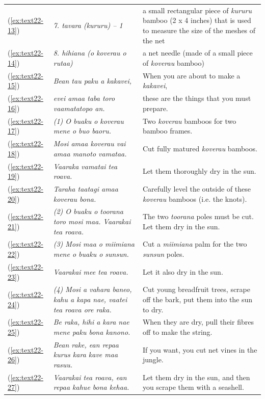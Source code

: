 \documentclass[output=paper]{langscibook}
\begin{document}
\begin{xltabular}{\textwidth}{lXX}
	(\ref{ex:text22-13})&\textit{7. tavara (kururu) -- 1}&a small rectangular piece of \textit{kururu} bamboo (2 x 4 inches) that is used to measure the size of the meshes of the net\\
    (\ref{ex:text22-14})&\textit{8. hihiana (o koverau o rutaa)}&a net needle (made of a small piece of \textit{koverau} bamboo)\\
	(\ref{ex:text22-15})&\textit{Bean tau paku a kakavei,}&When you are about to make a \textit{kakavei},\\
	(\ref{ex:text22-16})&\textit{evei amaa taba toro vaamatatopo an.}&these are the things that you must prepare.\\
	(\ref{ex:text22-17})&\textit{(1) O buaku o koverau mene o buo baoru.}&Two \textit{koverau} bamboos for two bamboo frames.\\
	(\ref{ex:text22-18})&\textit{Mosi amaa koverau vai amaa manoto vamataa.}&Cut fully matured \textit{koverau} bamboos.\\
	(\ref{ex:text22-19})&\textit{Vaaraka vamatai tea roava.}&Let them thoroughly dry in the sun.\\
	(\ref{ex:text22-20})&\textit{Taraha taatagi amaa koverau bona.}&Carefully level the outside of these \textit{koverau} bamboos (i.e. the knots).\\
	(\ref{ex:text22-21})&\textit{(2) O buaku o toorana toro mosi maa. Vaarakai tea roava.}&The two \textit{toorana} poles must be cut. Let them dry in the sun.\\
	(\ref{ex:text22-22})&\textit{(3) Mosi maa o miimiana mene o buaku o sunsun.}&Cut a \textit{miimiana} palm for the two \textit{sunsun} poles.\\
	(\ref{ex:text22-23})&\textit{Vaarakai mee tea roava.}&Let it also dry in the sun.\\
	(\ref{ex:text22-24})&\textit{(4) Mosi a vahara baneo, kahu a kapa nae, vaatei tea roava ore raka.}&Cut young breadfruit trees, scrape off the bark, put them into the sun to dry.\\
	(\ref{ex:text22-25})&\textit{Be raka, hihi a kara nae mene paku bona kanono.}&When they are dry, pull their fibres off to make the string.\\
	(\ref{ex:text22-26})&\textit{Bean rake, ean repaa kurus kara kave maa rasuu.}&If you want, you cut net vines in the jungle.\\
	(\ref{ex:text22-27})&\textit{Vaarakai tea roava, ean repaa kahue bona kehaa.}&Let them dry in the sun, and then you scrape them with a seashell.\\

\end{xltabular}
\end{document}
